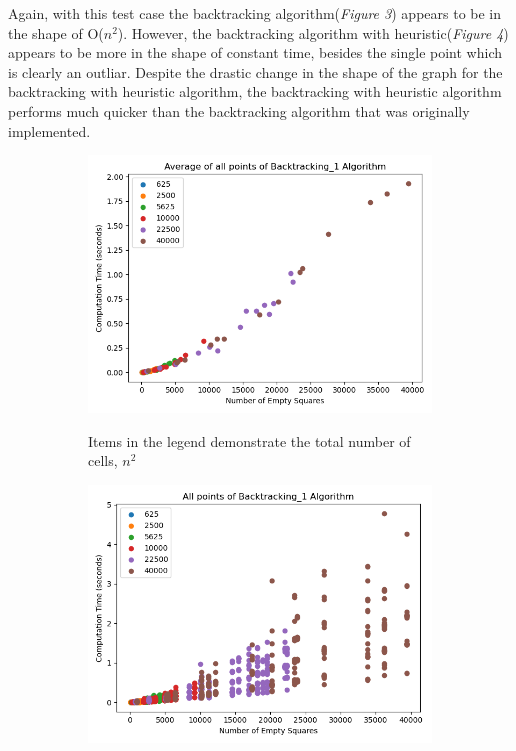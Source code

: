 \documentclass{article}
\begin{document}

Again, with this test case the backtracking algorithm(\textit{Figure 3}) appears to be in the shape of O($n^2$).
However, the backtracking algorithm with heuristic(\textit{Figure 4}) appears to be more in the shape of constant
time, besides the single point which is clearly an outliar. Despite the drastic change in the 
shape of the graph for the backtracking with heuristic algorithm, the backtracking with heuristic algorithm
performs much quicker than the backtracking algorithm that was originally implemented.

\bigskip

\begin{figure}[!h]
	\centering
	\begin{subfigure}{0.4\textwidth}
		\centering
		\includegraphics[scale=0.4]{scatter_avg_Backtracking_1-3.png}
		\label{Test 3: Average of all points}
		\caption{Items in the legend demonstrate the total number of cells, $n^2$}
	\end{subfigure}
	\hfill
	\begin{subfigure}{0.4\textwidth}
		\centering
		\includegraphics[scale=0.4]{scatter_Backtracking_1-3.png}

\end{subfigure}
\end{figure}
\end{document}
